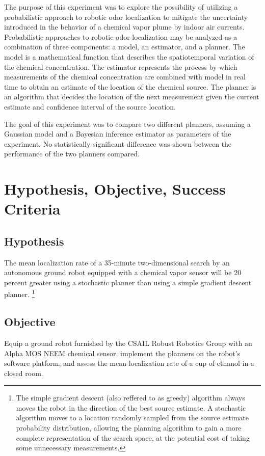 \documentclass[submit, 12pt]{aiaa-pretty-modified}
\begin{document}
The purpose of this experiment was to explore the possibility of
utilizing a probabilistic approach to robotic odor localization to mitigate the uncertainty
introduced in the behavior of a chemical vapor plume by indoor
air currents.  Probabilistic approaches to robotic odor localization may be analyzed as a combination of
three components: a model, an estimator, and a planner. The model is a
mathematical function that describes the spatiotemporal variation of the
chemical concentration. The estimator represents the process by which
measurements of the chemical concentration are combined with model in real time
to obtain an estimate of the location of the chemical source. The planner is an
algorithm that decides the location of the next measurement given the current
estimate and confidence interval of the source location.

The goal of this experiment was to compare two different planners,
assuming a Gaussian model and a Bayesian inference estimator as
parameters of the experiment.  No statistically significant difference
was shown between the performance of the two planners compared.

\section{Hypothesis, Objective, Success Criteria}
\label{sec:hos}
\subsection*{Hypothesis} 
The mean localization rate of a 35-minute two-dimensional search by an
autonomous ground robot equipped with a chemical vapor sensor will be 20 percent
greater using a stochastic planner than using a simple gradient descent planner.
\footnote{ The simple gradient descent (also reffered to as greedy) algorithm always moves the robot in the
  direction of the best source estimate. A stochastic algorithm moves to a
  location randomly sampled from the source estimate probability distribution,
  allowing the planning algorithm to gain a more complete representation of the
  search space, at the potential cost of taking some unnecessary measurements.}

\subsection*{Objective}
Equip a ground robot furnished by the CSAIL Robust Robotics Group with an Alpha MOS NEEM chemical sensor, implement the planners on the robot's software platform, and assess the mean localization rate of a cup of ethanol in a closed room.
\end{document}

